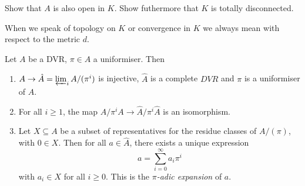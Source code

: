 \documentclass[a4paper]{article}
\begin{document}
\begin{ex}
  Show that \(A\) is also open in \(K\). Show futhermore that \(K\) is totally disconnected.
\end{ex}

\begin{remark}
  When we speak of topology on \(K\) or convergence in \(K\) we always mean with respect to the metric \(d\).
\end{remark}

\begin{proposition}
  Let \(A\) be a DVR, \(\pi \in A\) a uniformiser. Then
  \begin{enumerate}
  \item \(A \to \hat A = \varprojlim_i A/(\pi^i)\) is injective, \(\hat A\) is a complete \(DVR\) and \(\pi\) is a uniformiser of \(\hat A\).
  \item For all \(i \geq 1\), the map \(A/\pi^iA \to \hat A/\pi^i \hat A\) is an isomorphism.
  \item Let \(X \subseteq A\) be a subset of representatives for the residue classes of \(A/(\pi)\), with \(0 \in X\). Then for all \(a \in \hat A\), there exists a unique expression
    \[
      a = \sum_{i = 0}^\infty a_i \pi^i
    \]
    with \(a_i \in X\) for all \(i \geq 0\). This is the \emph{\(\pi\)-adic expansion} of \(a\).
  \end{enumerate}
\end{proposition}
\end{document}
